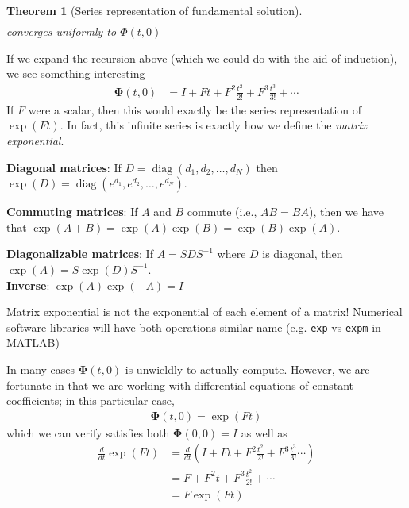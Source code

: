 \documentclass[a4paper,11pt]{exam}
\newtheorem{theorem}{Theorem}
\newcounter{ct}
\newcommand{\fundamentalSolution}{\boldsymbol{\Phi}}
\newcommand{\inv}{^{-1}}
\DeclareMathOperator*{\diag}{diag}
\begin{document}
\begin{questions}
\begin{tcolorbox}[colback=black!1!,title=Fundamental Solution]
\begin{theorem}[Series representation of fundamental solution]
\begin{align}
        \end{align}
        converges uniformly to $\Phi(t, 0)$
    \end{theorem}
    If we expand the recursion above (which we could do with the aid of induction), we see something interesting
    \begin{align}
        \fundamentalSolution(t, 0) &= I + Ft + F^2 \frac{t^2}{2!} + F^3 \frac{t^3}{3!} + \cdots
    \end{align}
    If $F$ were a scalar, then this would exactly be the series representation of $\exp(Ft)$.  In fact, this infinite series is exactly how we define the \textit{matrix exponential}.
\end{tcolorbox}

\begin{tcolorbox}[colback=black!1!,title=Properties of the matrix exponential]
    \textbf{Diagonal matrices}: If $D = \diag(d_1, d_2, \ldots, d_N)$ then $\exp(D) = \diag(e^{d_1}, e^{d_2}, \ldots, e^{d_N} )$.\newline

    \textbf{Commuting matrices}: If $A$ and $B$ commute (i.e., $AB = BA$), then we have that $\exp(A + B) = \exp(A) \exp(B) = \exp(B) \exp(A)$.\newline

    \textbf{Diagonalizable matrices}: If $A = SDS\inv$ where $D$ is diagonal, then
    $\exp(A) = S \exp(D) S\inv$.\\

    \textbf{Inverse}: $\exp(A) \exp(-A) = I$
\end{tcolorbox}

\begin{tcolorbox}[colback=black!1!,title=avoid this common pitfall]
    Matrix exponential is not the exponential of each element of a matrix!
    Numerical software libraries will have both operations similar name (e.g. \verb|exp| vs \verb|expm| in MATLAB)
\end{tcolorbox}

In many cases $\fundamentalSolution(t, 0)$ is unwieldly to actually compute.  However, we are fortunate in that we are working with differential equations of constant coefficients; in this particular case, 
\begin{align}
    \fundamentalSolution(t, 0) = \exp(F t)
\end{align}
which we can verify satisfies both $\fundamentalSolution(0, 0) = I$ as well as
\begin{align}
    \frac{d}{dt} \exp(Ft) &= \frac{d}{dt} \left(I + Ft + F^2 \frac{t^2}{2!} + F^3 \frac{t^3}{3!}\cdots  \right)\\
    &= F + F^2 t + F^3 \frac{t^2}{2!} + \cdots\\
    &= F \exp(F t)
\end{align}

\end{questions}
\end{document}
